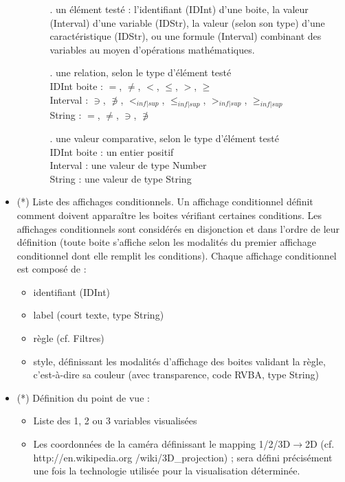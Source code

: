 \documentclass[a4paper]{article}
\begin{document}
\begin{itemize}
\begin{itemize}
    \begin{itemize}
    \item[.] un élément testé : l'identifiant (IDInt) d'une boite, la valeur (Interval) d'une variable (IDStr), la valeur (selon son type) d'une caractéristique (IDStr), ou une formule (Interval) combinant des variables au moyen d'opérations mathématiques.
    \item[.] une relation, selon le type d'élément testé\\
      IDInt boite : $=$, $\neq$, $<$, $\leq$, $>$, $\geq$\\
      Interval : $\ni$, $\not\ni$, $<_{inf|sup}$, $\leq_{inf|sup}$, $>_{inf|sup}$, $\geq_{inf|sup}$\\
      String : $=$, $\neq$, $\ni$, $\not\ni$
    \item[.] une valeur comparative, selon le type d'élément testé\\
      IDInt boite : un entier positif\\
      Interval : une valeur de type Number\\
      String : une valeur de type String
    \end{itemize}
  \end{itemize}
\item (*) Liste des affichages conditionnels. Un affichage conditionnel définit comment doivent apparaître les boites vérifiant certaines conditions. Les affichages conditionnels sont considérés en disjonction et dans l'ordre de leur définition (toute boite s'affiche selon les modalités du premier affichage conditionnel dont elle remplit les conditions). Chaque affichage conditionnel est composé de :
  \begin{itemize}
  \item identifiant (IDInt)
  \item label (court texte, type String)
  \item règle (cf. Filtres)
  \item style, définissant les modalités d'affichage des boites validant la règle, c'est-à-dire sa couleur (avec transparence, code RVBA, type String)
  \end{itemize}
\item (*) Définition du point de vue :
  \begin{itemize}
  \item Liste des 1, 2 ou 3 variables visualisées
  \item Les coordonnées de la caméra définissant le mapping 1/2/3D$\to$2D (cf. http://en.wikipedia.org /wiki/3D\_projection) ; sera défini précisément une fois la technologie utilisée pour la visualisation déterminée.
  \end{itemize}
\end{itemize}
\end{document}
